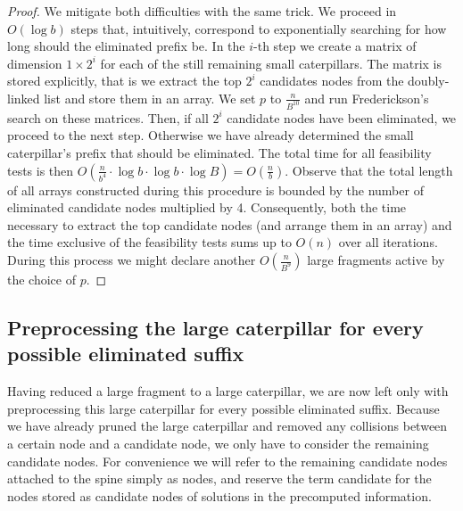 \documentclass[11pt,a4paper]{article}
\theoremstyle{definition}
\theoremstyle{remark}
\begin{document}
\begin{proof}
We mitigate both difficulties with the same trick. We proceed in $O(\log b)$ steps that, intuitively, correspond
to exponentially searching for how long should the eliminated prefix be. In the $i$-th step we
create a matrix of dimension $1\times 2^{i}$ for each of the still remaining small caterpillars.
The matrix is stored explicitly, that is we extract the top $2^{i}$ candidates nodes from the doubly-linked
list and store them in an array. We set $p$ to $\frac{n}{B^{10}}$ and run Frederickson's search
on these matrices. Then, if all $2^{i}$ candidate nodes have been eliminated, we proceed to the next
step. Otherwise we have already determined the small caterpillar's prefix that should be eliminated. The total time for all feasibility tests is then
$O(\frac{n}{b^{4}}\cdot \log b \cdot \log b \cdot \log B) = O(\frac{n}{b})$. 
Observe that the total length of all arrays constructed during this procedure is bounded by the number
of eliminated candidate nodes multiplied by 4. Consequently, both the time necessary
to extract the top candidate nodes (and arrange them in an array) and the time exclusive of the feasibility tests sums up to $O(n)$
over all iterations. During this process we might declare another $O(\frac{n}{B^9})$ large fragments active
by the choice of $p$.
\end{proof}


\subsection{Preprocessing the large caterpillar for every possible eliminated suffix}\label{section:lemma4}

Having reduced a large fragment to a large caterpillar, we are now left only with preprocessing this large caterpillar for every possible eliminated suffix.
Because we have already pruned the large caterpillar and removed any collisions between a certain
node and a candidate node, we only have to consider the remaining candidate nodes. For convenience we will refer to the remaining candidate nodes attached to the spine simply as nodes, and reserve the term candidate for the nodes stored as candidate nodes of solutions in the precomputed information.
\end{document}
